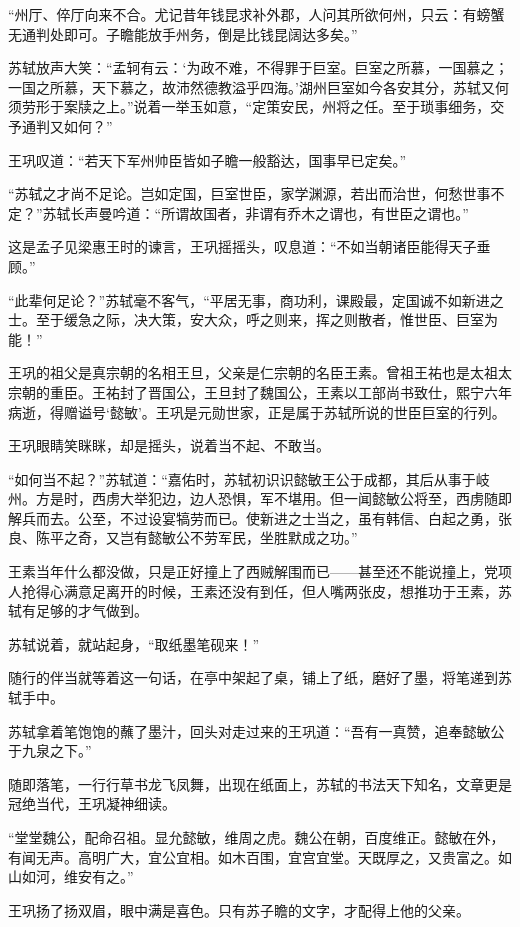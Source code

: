 “州厅、倅厅向来不合。尤记昔年钱昆求补外郡，人问其所欲何州，只云：有螃蟹无通判处即可。子瞻能放手州务，倒是比钱昆阔达多矣。”

苏轼放声大笑：“孟轲有云：‘为政不难，不得罪于巨室。巨室之所慕，一国慕之；一国之所慕，天下慕之，故沛然德教溢乎四海。’湖州巨室如今各安其分，苏轼又何须劳形于案牍之上。”说着一举玉如意，“定策安民，州将之任。至于琐事细务，交予通判又如何？”

王巩叹道：“若天下军州帅臣皆如子瞻一般豁达，国事早已定矣。”

“苏轼之才尚不足论。岂如定国，巨室世臣，家学渊源，若出而治世，何愁世事不定？”苏轼长声曼吟道：“所谓故国者，非谓有乔木之谓也，有世臣之谓也。”

这是孟子见梁惠王时的谏言，王巩摇摇头，叹息道：“不如当朝诸臣能得天子垂顾。”

“此辈何足论？”苏轼毫不客气，“平居无事，商功利，课殿最，定国诚不如新进之士。至于缓急之际，决大策，安大众，呼之则来，挥之则散者，惟世臣、巨室为能！”

王巩的祖父是真宗朝的名相王旦，父亲是仁宗朝的名臣王素。曾祖王祐也是太祖太宗朝的重臣。王祐封了晋国公，王旦封了魏国公，王素以工部尚书致仕，熙宁六年病逝，得赠谥号‘懿敏’。王巩是元勋世家，正是属于苏轼所说的世臣巨室的行列。

王巩眼睛笑眯眯，却是摇头，说着当不起、不敢当。

“如何当不起？”苏轼道：“嘉佑时，苏轼初识识懿敏王公于成都，其后从事于岐州。方是时，西虏大举犯边，边人恐惧，军不堪用。但一闻懿敏公将至，西虏随即解兵而去。公至，不过设宴犒劳而已。使新进之士当之，虽有韩信、白起之勇，张良、陈平之奇，又岂有懿敏公不劳军民，坐胜默成之功。”

王素当年什么都没做，只是正好撞上了西贼解围而已——甚至还不能说撞上，党项人抢得心满意足离开的时候，王素还没有到任，但人嘴两张皮，想推功于王素，苏轼有足够的才气做到。

苏轼说着，就站起身，“取纸墨笔砚来！”

随行的伴当就等着这一句话，在亭中架起了桌，铺上了纸，磨好了墨，将笔递到苏轼手中。

苏轼拿着笔饱饱的蘸了墨汁，回头对走过来的王巩道：“吾有一真赞，追奉懿敏公于九泉之下。”

随即落笔，一行行草书龙飞凤舞，出现在纸面上，苏轼的书法天下知名，文章更是冠绝当代，王巩凝神细读。

“堂堂魏公，配命召祖。显允懿敏，维周之虎。魏公在朝，百度维正。懿敏在外，有闻无声。高明广大，宜公宜相。如木百围，宜宫宜堂。天既厚之，又贵富之。如山如河，维安有之。”

王巩扬了扬双眉，眼中满是喜色。只有苏子瞻的文字，才配得上他的父亲。

